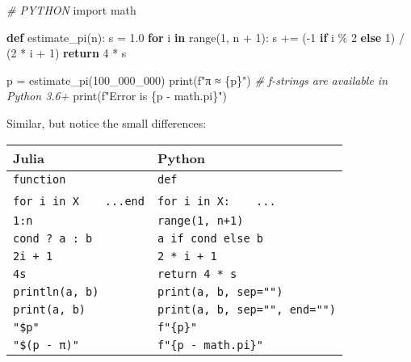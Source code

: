 \documentclass[11pt]{article}
\newenvironment{Shaded}{}{}
\newcommand{\KeywordTok}[1]{\textcolor[rgb]{0.00,0.44,0.13}{\textbf{{#1}}}}
\newcommand{\DecValTok}[1]{\textcolor[rgb]{0.25,0.63,0.44}{{#1}}}
\newcommand{\FloatTok}[1]{\textcolor[rgb]{0.25,0.63,0.44}{{#1}}}
\newcommand{\CommentTok}[1]{\textcolor[rgb]{0.38,0.63,0.69}{\textit{{#1}}}}
\newcommand{\NormalTok}[1]{{#1}}
\newcommand{\SpecialCharTok}[1]{\textcolor[rgb]{0.25,0.44,0.63}{{#1}}}
\newcommand{\SpecialStringTok}[1]{\textcolor[rgb]{0.73,0.40,0.53}{{#1}}}
\newcommand{\ImportTok}[1]{{#1}}
\newcommand{\ControlFlowTok}[1]{\textcolor[rgb]{0.00,0.44,0.13}{\textbf{{#1}}}}
\newcommand{\OperatorTok}[1]{\textcolor[rgb]{0.40,0.40,0.40}{{#1}}}
\newcommand{\BuiltInTok}[1]{{#1}}
\begin{document}
    \begin{Shaded}
\begin{Highlighting}[]
\CommentTok{\# PYTHON}
\ImportTok{import}\NormalTok{ math}

\KeywordTok{def}\NormalTok{ estimate\_pi(n):}
\NormalTok{    s }\OperatorTok{=} \FloatTok{1.0}
    \ControlFlowTok{for}\NormalTok{ i }\KeywordTok{in} \BuiltInTok{range}\NormalTok{(}\DecValTok{1}\NormalTok{, n }\OperatorTok{+} \DecValTok{1}\NormalTok{):}
\NormalTok{        s }\OperatorTok{+=}\NormalTok{ (}\OperatorTok{{-}}\DecValTok{1} \ControlFlowTok{if}\NormalTok{ i }\OperatorTok{\%} \DecValTok{2} \ControlFlowTok{else} \DecValTok{1}\NormalTok{) }\OperatorTok{/}\NormalTok{ (}\DecValTok{2} \OperatorTok{*}\NormalTok{ i }\OperatorTok{+} \DecValTok{1}\NormalTok{)}
    \ControlFlowTok{return} \DecValTok{4} \OperatorTok{*}\NormalTok{ s}

\NormalTok{p }\OperatorTok{=}\NormalTok{ estimate\_pi(}\DecValTok{100\_000\_000}\NormalTok{)}
\BuiltInTok{print}\NormalTok{(}\SpecialStringTok{f"π ≈ }\SpecialCharTok{\{p\}}\SpecialStringTok{"}\NormalTok{) }\CommentTok{\# f{-}strings are available in Python 3.6+}
\BuiltInTok{print}\NormalTok{(}\SpecialStringTok{f"Error is }\SpecialCharTok{\{p} \OperatorTok{{-}}\NormalTok{ math}\SpecialCharTok{.pi\}}\SpecialStringTok{"}\NormalTok{)}
\end{Highlighting}
\end{Shaded}

    Similar, but notice the small differences:

\begin{longtable}[]{@{}ll@{}}
\toprule
Julia & Python \\
\midrule
\endhead
\texttt{function} & \texttt{def} \\
\texttt{for\ i\ in\ X}~~~~\texttt{...}\texttt{end} &
\texttt{for\ i\ in\ X:}~~~~\texttt{...} \\
\texttt{1:n} & \texttt{range(1,\ n+1)} \\
\texttt{cond\ ?\ a\ :\ b} & \texttt{a\ if\ cond\ else\ b} \\
\texttt{2i\ +\ 1} & \texttt{2\ *\ i\ +\ 1} \\
\texttt{4s} & \texttt{return\ 4\ *\ s} \\
\texttt{println(a,\ b)} & \texttt{print(a,\ b,\ sep="")} \\
\texttt{print(a,\ b)} & \texttt{print(a,\ b,\ sep="",\ end="")} \\
\texttt{"\$p"} & \texttt{f"\{p\}"} \\
\texttt{"\$(p\ -\ π)"} & \texttt{f"\{p\ -\ math.pi\}"} \\
\bottomrule
\end{longtable}
\end{document}
